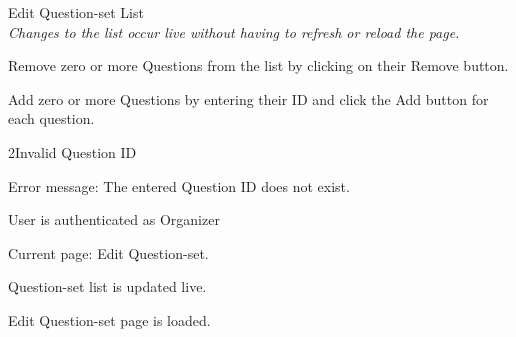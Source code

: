 
\begin{uc}{Edit Question-set List} \\
	\emph{Changes to the list occur live without having to refresh or reload the page.}\\
	
	
    \begin{uc-mss}
    \item Remove zero or more Questions from the list by clicking on their Remove button.
	\item Add zero or more Questions by entering their ID and click the Add button for
	each question.
    \end{uc-mss}

    \begin{uc-ext}

        \begin{uc-fail}{2}{Invalid Question ID}
        \item Error message: The entered Question ID does not exist.
        \end{uc-fail}

    \end{uc-ext}

    \begin{uc-pre}
    \item User is authenticated as Organizer
    \item Current page: Edit Question-set.
    \end{uc-pre}

    \begin{uc-post}
    \item Question-set list is updated live.
    \end{uc-post}

    \begin{uc-trig}
        Edit Question-set page is loaded.
    \end{uc-trig}

\end{uc}
